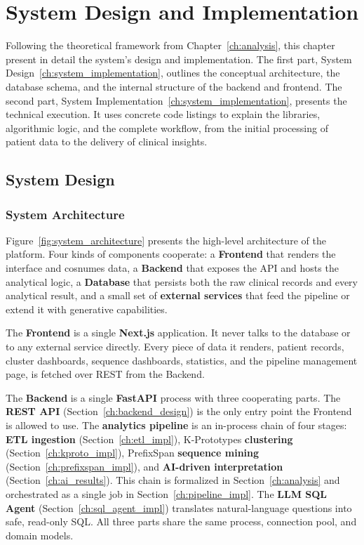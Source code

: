 \chapter{System Design and Implementation}
\label{ch:design}
\pagestyle{fancy}

Following the theoretical framework from Chapter~\ref{ch:analysis}, this chapter present in detail the system's design and implementation. The first part, System Design~\ref{ch:system_implementation}, outlines the conceptual architecture, the database schema, and the internal structure of the backend and frontend. The second part, System Implementation~\ref{ch:system_implementation}, presents the technical execution. It uses concrete code listings to explain the libraries, algorithmic logic, and the complete workflow, from the initial processing of patient data to the delivery of clinical insights.

\section{System Design}
\label{ch:system_design}

\subsection{System Architecture}
\label{ch:system_architecture}

Figure~\ref{fig:system_architecture} presents the high-level architecture of the platform. Four kinds of components cooperate: a \textbf{Frontend} that renders the interface and cosnumes data, a \textbf{Backend} that exposes the API and hosts the analytical logic, a \textbf{Database} that persists both the raw clinical records and every analytical result, and a small set of \textbf{external services} that feed the pipeline or extend it with generative capabilities.

The \textbf{Frontend} is a single \textbf{Next.js} application. It never talks to the database or to any external service directly. Every piece of data it renders, patient records, cluster dashboards, sequence dashboards, statistics, and the pipeline management page, is fetched over REST from the Backend.

The \textbf{Backend} is a single \textbf{FastAPI} process with three cooperating parts. The \textbf{REST API} (Section~\ref{ch:backend_design}) is the only entry point the Frontend is allowed to use. The \textbf{analytics pipeline} is an in-process chain of four stages: \textbf{ETL ingestion} (Section~\ref{ch:etl_impl}), K-Prototypes \textbf{clustering} (Section~\ref{ch:kproto_impl}), PrefixSpan \textbf{sequence mining} (Section~\ref{ch:prefixspan_impl}), and \textbf{AI-driven interpretation} (Section~\ref{ch:ai_results}). This chain is formalized in Section~\ref{ch:analysis} and orchestrated as a single job in Section~\ref{ch:pipeline_impl}. The \textbf{LLM SQL Agent} (Section~\ref{ch:sql_agent_impl}) translates natural-language questions into safe, read-only SQL. All three parts share the same process, connection pool, and domain models.

